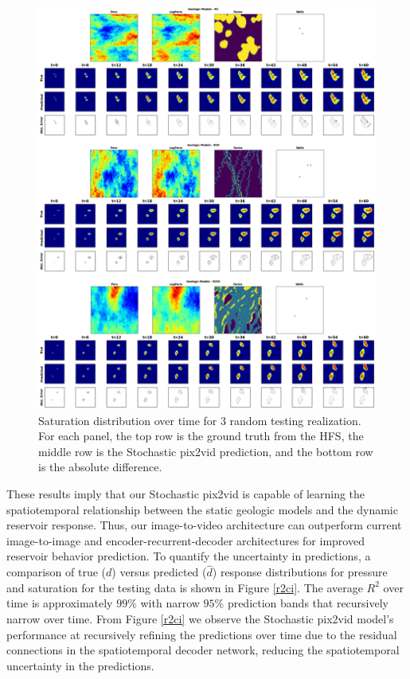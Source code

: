 \documentclass[10pt, twoside]{article}
\begin{document}
\begin{figure}
    \centering
    \includegraphics[width=16cm]{figures/test_sat.png}
    \caption{Saturation distribution over time for 3 random testing realization. For each panel, the top row is the ground truth from the HFS, the middle row is the Stochastic pix2vid prediction, and the bottom row is the absolute difference.}
    \label{test_sat}
\end{figure}

These results imply that our Stochastic pix2vid is capable of learning the spatiotemporal relationship between the static geologic models and the dynamic reservoir response. Thus, our image-to-video architecture can outperform current image-to-image and encoder-recurrent-decoder architectures for improved reservoir behavior prediction. To quantify the uncertainty in predictions, a comparison of true ($d$) versus predicted ($\hat{d}$) response distributions for pressure and saturation for the testing data is shown in Figure \ref{r2ci}. The average $R^2$ over time is approximately $99\%$ with narrow $95\%$ prediction bands that recursively narrow over time. From Figure \ref{r2ci} we observe the Stochastic pix2vid model's performance at recursively refining the predictions over time due to the residual connections in the spatiotemporal decoder network, reducing the spatiotemporal uncertainty in the predictions.
\end{document}
